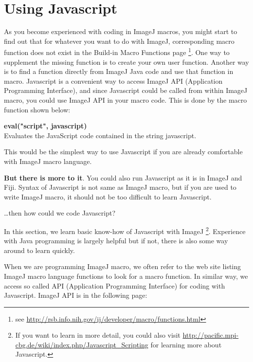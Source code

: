 \documentclass[11pt,a4paper,oneside]{report}
\newenvironment{indentCom}%
{\begin{list}{}%
         {\setlength{\leftmargin}{1em}}%
         \item[]%
}
{\end{list}}
\begin{document}
\newpage

\section{Using Javascript}

As you become experienced with coding in ImageJ macros, you might start to find
out that for whatever you want to do with ImageJ, 
corresponding macro function does not exist in the Build-in Macro Functions page
\footnote{ see \url{http://rsb.info.nih.gov/ij/developer/macro/functions.html}}. 
One way to supplement the missing function is to create your own user function. 
Another way is to find a function directly from ImageJ Java code and use that function in macro. 
Javascript is a convenient way to access ImageJ API (Application Programming Interface), 
and since Javascript could be called from within ImageJ macro, you could use ImageJ API in your macro code. 
This is done by the macro function shown below:
\begin{shaded}
\begin{indentCom}
\item \textbf{eval("script", javascript)}\\
Evaluates the JavaScript code contained in the string javascript.\\
\end{indentCom}
\end{shaded}

This would be the simplest way to use Javascript if you are already
comfortable with ImageJ macro language. 

\textbf{But there is more to it}. You could also run Javascript as it is in
ImageJ and Fiji. Syntax of Javascript is not same as ImageJ macro, 
but if you are used to write ImageJ macro, it should not be too difficult to learn Javascript.  
 
\dots then how could we code Javascript? 

In this section, we learn basic know-how of 
Javascript with ImageJ 
\footnote{ If you want to learn in more detail, 
you could also visit \url{http://pacific.mpi-cbg.de/wiki/index.php/Javascript_Scripting} 
for learning more about Javascript.}. Experience with 
Java programming is largely helpful but if not, there is also some way around
to learn quickly. 

When we are programming ImageJ macro, we often refer to the
web site listing ImageJ macro language functions to look for a macro function. 
In similar way, we access so called API (Application Programming Interface) 
for coding with Javascript. ImageJ API is in the following page:
\end{document}
